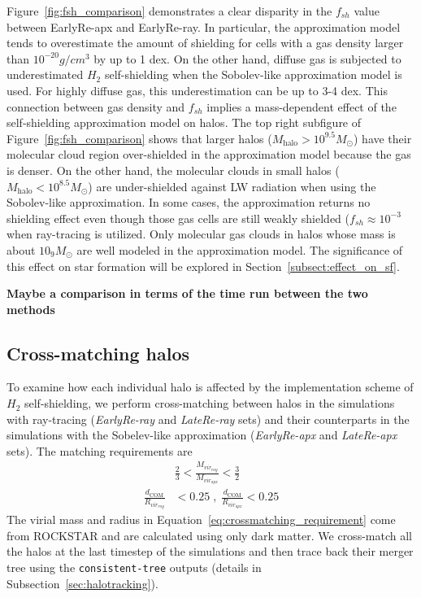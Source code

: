 \documentclass[linenumbers, twocolumn]{aastex631}
\begin{document}
Figure~\ref{fig:fsh_comparison} demonstrates a clear disparity in the $f_{sh}$ value between EarlyRe-apx and EarlyRe-ray. In particular, the approximation model tends to overestimate the amount of shielding for cells with a gas density larger than $10^{-20} g/cm^3$ by up to 1 dex. On the other hand, diffuse gas is subjected to underestimated $H_{2}$ self-shielding when the Sobolev-like approximation model is used. For highly diffuse gas, this underestimation can be up to 3-4 dex. This connection between gas density and $f_{sh}$ implies a mass-dependent effect of the self-shielding approximation model on halos. The top right subfigure of Figure~\ref{fig:fsh_comparison} shows that larger halos ($M_{\text{halo}} > 10^{9.5} M_{\odot}$) have their molecular cloud region over-shielded in the approximation model because the gas is denser. On the other hand, the molecular clouds in small halos ($M_{\text{halo}} < 10^{8.5} M_{\odot}$) are under-shielded against LW radiation when using the Sobolev-like approximation. In some cases, the approximation returns no shielding effect even though those gas cells are still weakly shielded ($f_{sh} \approx 10^{-3}$ when ray-tracing is utilized. Only molecular gas clouds in halos whose mass is about $10_{9} M_\odot$ are well modeled in the approximation model. The significance of this effect on star formation will be explored in Section~\ref{subsect:effect_on_sf}.

\textbf{Maybe a comparison in terms of the time run between the two methods}

\subsection{Cross-matching halos}
\label{subsect:cross-matching_halos}
To examine how each individual halo is affected by the implementation scheme of $H_{2}$ self-shielding, we perform cross-matching between halos in the simulations with ray-tracing (\textit{EarlyRe-ray} and \textit{LateRe-ray} sets) and their counterparts in the simulations with the Sobelev-like approximation (\textit{EarlyRe-apx} and \textit{LateRe-apx} sets). The matching requirements are
\begin{align}
    & \frac{2}{3} < \frac{M_{vir_{ray}}}{M_{vir_{apx}}} < \frac{3}{2} \nonumber \\
    \frac{d_{\text{COM}}}{R_{vir_{ray}}} & < 0.25 \; , \; \frac{d_{\text{COM}}}{R_{vir_{apx}}} < 0.25 
\label{eq:crossmatching_requirement}
\end{align}
The virial mass and radius in Equation~\ref{eq:crossmatching_requirement} come from ROCKSTAR and are calculated using only dark matter. We cross-match all the halos at the last timestep of the simulations and then trace back their merger tree using the \texttt{consistent-tree} outputs (details in Subsection~\ref{sec:halotracking}).
\end{document}
